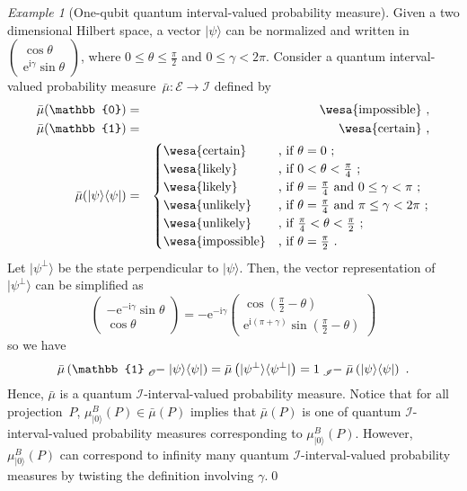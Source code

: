 \documentclass{article}
\theoremstyle{remark}
\newtheorem{example}{Example}
\newcommand{\events}{\ensuremath{\mathcal{E}}}
\newcommand{\ket}[1]{|#1\rangle}
\newcommand{\proj}[1]{|#1 \rangle\langle #1 |}
\newcommand{\imposs}{{\mbox{\wesa{impossible}}}}
\newcommand{\likely}{{\mbox{\wesa{likely}}}}
\newcommand{\unlikely}{{\mbox{\wesa{unlikely}}}}
\newcommand{\necess}{{\mbox{\wesa{certain}}}}
\newcommand{\rme}{\mathrm{e}}
\newcommand{\rmi}{\mathrm{i}}
\begin{document}
\begin{example}[One-qubit quantum interval-valued probability measure]\label{ex:One-qubit-quantum-interval}
Given a two dimensional Hilbert space, a vector $\ket{\psi}$ can
be normalized and written in $\left(\begin{array}{c}
\cos\theta\\
\rme^{\rmi\gamma}\sin\theta
\end{array}\right)$, where $0\le\theta\le\frac{\pi}{2}$ and $0\le\gamma<2\pi$. Consider
a quantum interval-valued probability measure~$\bar{\mu}:\events\rightarrow\mathscr{I}$
defined by 
\begin{eqnarray*}
\bar{\mu}(\mathbb{0}) & = & \imposs\textrm{ ,}\\
\bar{\mu}(\mathbb{1}) & = & \necess\textrm{ ,}\\
\bar{\mu}(\proj{\psi}) & = & \begin{cases}
\necess & \textrm{, if }\theta=0\textrm{ ;}\\
\likely & \textrm{, if }0<\theta<\frac{\pi}{4}\textrm{ ;}\\
\likely & \textrm{, if }\theta=\frac{\pi}{4}\textrm{ and }0\le\gamma<\pi\textrm{ ;}\\
\unlikely & \textrm{, if }\theta=\frac{\pi}{4}\textrm{ and }\pi\le\gamma<2\pi\textrm{ ;}\\
\unlikely & \textrm{, if }\frac{\pi}{4}<\theta<\frac{\pi}{2}\textrm{ ;}\\
\imposs & \textrm{, if }\theta=\frac{\pi}{2}\textrm{ .}
\end{cases}
\end{eqnarray*}
Let $\ket{\psi^{\perp}}$ be the state perpendicular to $\ket{\psi}$.
Then, the vector representation of $\ket{\psi^{\perp}}$ can be simplified
as 
\[
\left(\begin{array}{c}
-\rme^{-\rmi\gamma}\sin\theta\\
\cos\theta
\end{array}\right)=-\rme^{-\rmi\gamma}\left(\begin{array}{c}
\cos\left(\frac{\pi}{2}-\theta\right)\\
\rme^{\rmi\left(\pi+\gamma\right)}\sin\left(\frac{\pi}{2}-\theta\right)
\end{array}\right)
\]
so we have 
\[
\bar{\mu}\left(\mathbb{1}\tensor*[_{\mathscr{O}}]{-}{}\proj{\psi}\right)=\bar{\mu}\left(\proj{\psi^{\perp}}\right)=1\tensor*[_{\mathscr{I}}]{-}{}\bar{\mu}\left(\proj{\psi}\right)\textrm{ .}
\]
Hence, $\bar{\mu}$ is a quantum $\mathscr{I}$-interval-valued probability
measure. Notice that for all projection~$P$, $\mu_{\ket{0}}^{B}(P)\in\bar{\mu}(P)$
implies that $\bar{\mu}(P)$ is one of quantum $\mathscr{I}$-interval-valued
probability measures corresponding to $\mu_{\ket{0}}^{B}(P)$. However,
$\mu_{\ket{0}}^{B}(P)$ can correspond to infinity many quantum $\mathscr{I}$-interval-valued
probability measures by twisting the definition involving $\gamma$.\qed\end{example}
\end{document}
